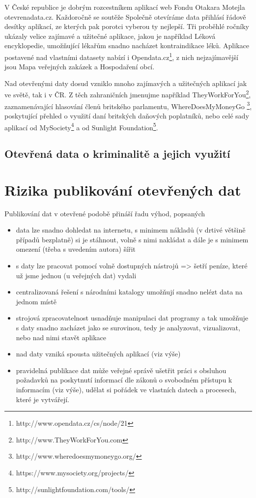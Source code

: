 V České republice je dobrým rozcestníkem aplikací web Fondu Otakara Motejla otevrenadata.cz. Každoročně se soutěže Společně otevíráme data přihlásí řádově desítky aplikací, ze kterých pak porotci vyberou ty nejlepší. Tři proběhlé ročníky ukázaly velice zajímavé a užitečné aplikace, jakou je například Léková encyklopedie, umožňující lékařům snadno nacházet kontraindikace léků. Aplikace postavené nad vlastními datasety nabízí i Opendata.cz\footnote{http://www.opendata.cz/cs/node/21}, z nich nejzajímavější jsou Mapa veřejných zakázek a Hospodaření obcí.

Nad otevřenými daty dosud vzniklo mnoho zajímavých a užitečných aplikací jak ve světě, tak i v ČR. Z těch zahraničních jmenujme například TheyWorkForYou\footnote{http://www.TheyWorkForYou.com}, zaznamenávající hlasování členů britského parlamentu, WhereDoesMyMoneyGo \footnote{http://www.wheredoesmymoneygo.org/}, poskytující přehled o využití daní britských daňových poplatníků, nebo celé sady aplikací od MySociety\footnote{https://www.mysociety.org/projects/} a od Sunlight Foundation\footnote{http://sunlightfoundation.com/tools/}.

\subsection{Otevřená data o kriminalitě a jejich využití}



\section{Rizika publikování otevřených dat}

Publikování dat v otevřené podobě přináší řadu výhod, popsaných 
\begin{itemize}
	\item data lze snadno dohledat na internetu, s minimem nákladů (v drtivé většině případů bezplatně) si je stáhnout, volně s nimi nakládat a dále je s minimem omezení (třeba s uvedením autora) šířit
	\item s daty lze pracovat pomocí volně dostupných nástrojů => šetří peníze, které už jsme jednou (u veřejných dat) vydali
	\item centralizovaná řešení s národními katalogy umožňují snadno nelézt data na jednom místě
	\item strojová zpracovatelnost usnadňuje manipulaci dat programy a tak umožňuje s daty snadno zacházet jako se surovinou, tedy je analyzovat, vizualizovat, nebo nad nimi stavět aplikace
	\item nad daty vzniká spousta užitečných aplikací (viz výše)
	\item pravidelná publikace dat může veřejné správě ušetřit práci s obsluhou požadavků na poskytnutí informací dle zákonů o svobodném přístupu k informacím (viz výše), udělat si pořádek ve vlastních datech a procesech, které je vytvářejí.
\end{itemize}

